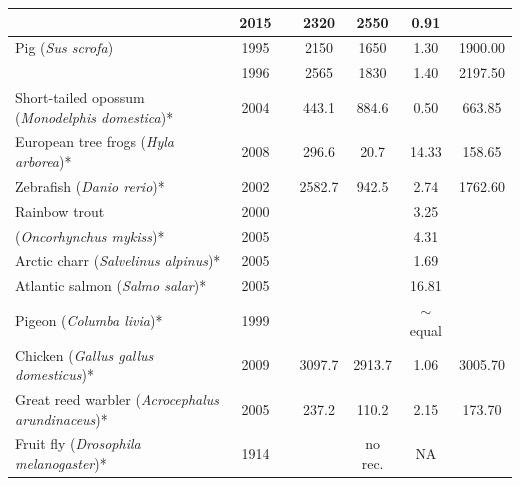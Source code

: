 {\begin{table}[p]
\begin{tabular}{|P{3.2cm}|c|c|c|c|c|c|}
        & 2015 & \citet{Ma2015} & 2320 & 2550 & 0.91 &  \\ \hline
Pig (\textit{Sus scrofa}) & 1995 & \citet{Archibald1995} & 2150 & 1650 & 1.30 & 1900.00 \\
     & 1996 & \citet{Marklund1996} & 2565 & 1830 & 1.40 & 2197.50 \\ \hline
Short-tailed opossum (\textit{Monodelphis domestica})* & 2004 & \citet{Samollow2004} & 443.1 & 884.6 & 0.50 & 663.85 \\ \hline
European tree frogs (\textit{Hyla arborea})* & 2008 & \citet{Berset-Brandli2008} & 296.6 & 20.7 & 14.33 & 158.65 \\ \hline
Zebrafish (\textit{Danio rerio})* & 2002 & \citet{Singer2002} & 2582.7 & 942.5 & 2.74 & 1762.60 \\ \hline
Rainbow trout  & 2000 & \citet{Sakamoto2000} &  &  & 3.25 &  \\
(\textit{Oncorhynchus mykiss})* & 2005 & \citet{Danzmann2005} &  &  & 4.31 &  \\ \hline
Arctic charr (\textit{Salvelinus alpinus})* & 2005 & \citet{Danzmann2005} &  &  & 1.69 &  \\ \hline
Atlantic salmon (\textit{Salmo salar})* & 2005 & \citet{Danzmann2005} &  &  & 16.81 &  \\ \hline
Pigeon (\textit{Columba livia})* & 1999 & \citet{Pigozzi1999} &  &  & $\sim$equal &  \\ \hline
Chicken (\textit{Gallus gallus domesticus})* & 2009 & \citet{Groenen2009} & 3097.7 & 2913.7 & 1.06 & 3005.70 \\ \hline
Great reed warbler (\textit{Acrocephalus arundinaceus})* & 2005 & \citet{Hansson2005} & 237.2 & 110.2 & 2.15 & 173.70 \\ \hline
Fruit fly (\textit{Drosophila melanogaster})* & 1914 & \citet{Morgan1914} &  & no rec. & NA &  \\
    \hline \end{tabular}
\end{table}
\clearpage}

